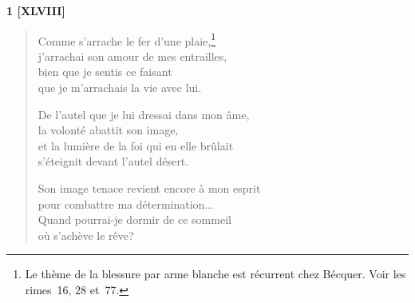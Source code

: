 

\begin{center}
  \textbf{1 [XLVIII]}
\end{center}

\begin{verse}
  Comme s'arrache le fer d'une plaie,\footnote{Le thème de la blessure
  par arme blanche est récurrent chez Bécquer. Voir les rimes~16, 28
  et~77.} \\
  j'arrachai son amour de mes entrailles, \\
  bien que je sentis ce faisant \\
  que je m'arrachais la vie avec lui.

  De l'autel que je lui dressai dans mon âme, \\
  la volonté abattit son image, \\
  et la lumière de la foi qui en elle brûlait \\
  s'éteignit devant l'autel désert.

  Son image tenace revient encore à mon esprit \\
  pour combattre ma détermination... \\
  Quand pourrai-je dormir de ce sommeil \\
  où s'achève le rêve?
\end{verse}





